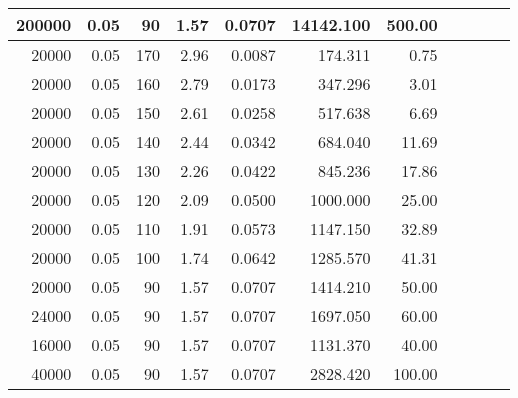 \begin{tabular}{| r | r | r | r || r | r | r | r | r | r | r |}
	200000  & 0.05  & 90             & 1.57           & 0.0707  & 14142.100 & 500.00  \\ \hline %
	20000   & 0.05  & 170            & 2.96           & 0.0087  & 174.311   & 0.75    \\ \hline %
	20000   & 0.05  & 160            & 2.79           & 0.0173  & 347.296   & 3.01    \\ \hline %
	20000   & 0.05  & 150            & 2.61           & 0.0258  & 517.638   & 6.69    \\ \hline %
	20000   & 0.05  & 140            & 2.44           & 0.0342  & 684.040   & 11.69   \\ \hline %
	20000   & 0.05  & 130            & 2.26           & 0.0422  & 845.236   & 17.86   \\ \hline %
	20000   & 0.05  & 120            & 2.09           & 0.0500  & 1000.000  & 25.00   \\ \hline %
	20000   & 0.05  & 110            & 1.91           & 0.0573  & 1147.150  & 32.89   \\ \hline %
	20000   & 0.05  & 100            & 1.74           & 0.0642  & 1285.570  & 41.31   \\ \hline %
	20000   & 0.05  & 90             & 1.57           & 0.0707  & 1414.210  & 50.00   \\ \hline %
	24000   & 0.05  & 90             & 1.57           & 0.0707  & 1697.050  & 60.00   \\ \hline %
	16000   & 0.05  & 90             & 1.57           & 0.0707  & 1131.370  & 40.00   \\ \hline %
	40000   & 0.05  & 90             & 1.57           & 0.0707  & 2828.420  & 100.00 \\ \hline %
\end{tabular}
